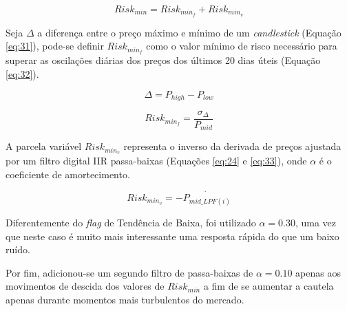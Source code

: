 \begin{itemize}
    \begin{equation} \label{eq:30}
        Risk_{min} = Risk_{min_f} + Risk_{min_v}
    \end{equation}

    Seja \begin{math} \Delta \end{math} a diferença entre o preço máximo e mínimo de um \textit{candlestick} (Equação \ref{eq:31}), pode-se definir \begin{math} Risk_{min_f} \end{math} como o valor mínimo de risco necessário para superar as oscilações diárias dos preços dos últimos 20 dias úteis (Equação \ref{eq:32}).

    \begin{equation} \label{eq:31}
        \Delta = P_{high} - P_{low}
    \end{equation}

    \begin{equation} \label{eq:32}
        Risk_{min_f} = \dfrac{ \sigma_{\Delta} }{ P_{mid} }
    \end{equation}

    A parcela variável \begin{math} Risk_{min_v} \end{math} representa o inverso da derivada de preços ajustada por um filtro digital IIR passa-baixas (Equações \ref{eq:24} e \ref{eq:33}), onde \begin{math} \alpha \end{math} é o coeficiente de amortecimento.

    \begin{equation} \label{eq:33}
        Risk_{min_v} = - \dot{P_{mid\_LPF(i)}}
    \end{equation}

    Diferentemente do \textit{flag} de Tendência de Baixa, foi utilizado \begin{math} \alpha = 0.30 \end{math}, uma vez que neste caso é muito mais interessante uma resposta rápida do que um baixo ruído.

    Por fim, adicionou-se um segundo filtro de passa-baixas de \begin{math} \alpha = 0.10 \end{math} apenas aos movimentos de descida dos valores de \begin{math} Risk_{min} \end{math} a fim de se aumentar a cautela apenas durante momentos mais turbulentos do mercado.


\end{itemize}

